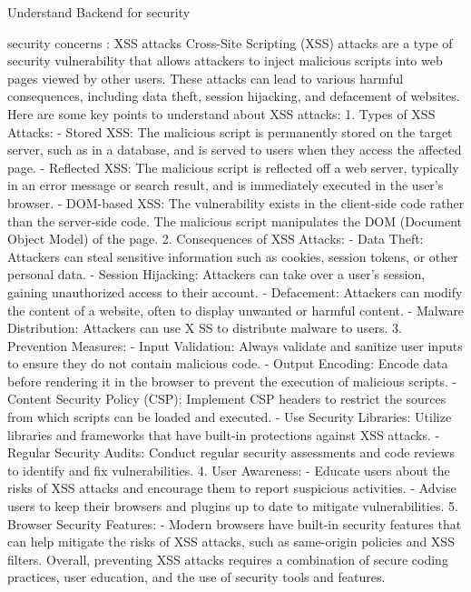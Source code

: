 {Understand Backend for security



security concerns : XSS attacks
Cross-Site Scripting (XSS) attacks are a type of security vulnerability 
that allows attackers to inject malicious scripts into web pages viewed by other users.
 These attacks can lead to various harmful consequences, including data theft, session hijacking, and defacement of websites. 
 Here are some key points
to understand about XSS attacks:
1. Types of XSS Attacks:
   - Stored XSS: The malicious script is permanently stored on the target server, such as in a database, and is served to users when they access the affected page.
   - Reflected XSS: The malicious script is reflected off a web server, typically in an error message or search result, and is immediately executed in the user's browser.
   - DOM-based XSS: The vulnerability exists in the client-side code rather than the server-side code. The malicious script manipulates the DOM (Document Object Model) of the page.
2. Consequences of XSS Attacks:
   - Data Theft: Attackers can steal sensitive information such as cookies, session tokens, or other personal data.
   - Session Hijacking: Attackers can take over a user's session, gaining unauthorized access to their account.
   - Defacement: Attackers can modify the content of a website, often to display unwanted or harmful content.
   - Malware Distribution: Attackers can use X  SS to distribute malware to users.
3. Prevention Measures:
   - Input Validation: Always validate and sanitize user inputs to ensure they do not contain malicious code.
   - Output Encoding: Encode data before rendering it in the browser to prevent the execution of malicious scripts.
   - Content Security Policy (CSP): Implement CSP headers to restrict the sources from which    scripts can be loaded and executed.
   - Use Security Libraries: Utilize libraries and frameworks that have built-in protections against XSS attacks.
   - Regular Security Audits: Conduct regular security assessments and code reviews to identify and fix vulnerabilities.
4. User Awareness:
   - Educate users about the risks of XSS attacks and encourage them to report suspicious activities.
   - Advise users to keep their browsers and plugins up to date to mitigate vulnerabilities.        
5. Browser Security Features:
   - Modern browsers have built-in security features that can help mitigate the risks of XSS attacks, such as same-origin policies and XSS filters.
Overall, preventing XSS attacks requires a combination of secure coding practices, user education, and the use of security tools and features.



}

